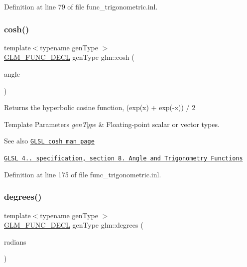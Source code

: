 Definition at line 79 of file func\+\_\+trigonometric.\+inl.

\mbox{\label{group__core__func__trigonometric_gaa7685634f6e920ba9a683e5ec7aed976}} 
\subsubsection{\texorpdfstring{cosh()}{cosh()}}
{\footnotesize\ttfamily template$<$typename gen\+Type $>$ \\
\hyperlink{setup_8hpp_ab2d052de21a70539923e9bcbf6e83a51}{G\+L\+M\+\_\+\+F\+U\+N\+C\+\_\+\+D\+E\+CL} gen\+Type glm\+::cosh (\begin{DoxyParamCaption}\item[{gen\+Type const \&}]{angle }\end{DoxyParamCaption})}

Returns the hyperbolic cosine function, (exp(x) + exp(-\/x)) / 2


\begin{DoxyTemplParams}{Template Parameters}
{\em gen\+Type} & Floating-\/point scalar or vector types.\\
\hline
\end{DoxyTemplParams}
\begin{DoxySeeAlso}{See also}
\href{http://www.opengl.org/sdk/docs/manglsl/xhtml/cosh.xml}{\tt G\+L\+SL cosh man page} 

\href{http://www.opengl.org/registry/doc/GLSLangSpec.4.20.8.pdf}{\tt G\+L\+SL 4.. specification, section 8. Angle and Trigonometry Functions} 
\end{DoxySeeAlso}


Definition at line 175 of file func\+\_\+trigonometric.\+inl.

\mbox{\label{group__core__func__trigonometric_gaf4e5661bd1c993f6090d49e988a4c78a}} 
\subsubsection{\texorpdfstring{degrees()}{degrees()}}
{\footnotesize\ttfamily template$<$typename gen\+Type $>$ \\
\hyperlink{setup_8hpp_ab2d052de21a70539923e9bcbf6e83a51}{G\+L\+M\+\_\+\+F\+U\+N\+C\+\_\+\+D\+E\+CL} gen\+Type glm\+::degrees (\begin{DoxyParamCaption}\item[{gen\+Type const \&}]{radians }\end{DoxyParamCaption})}

